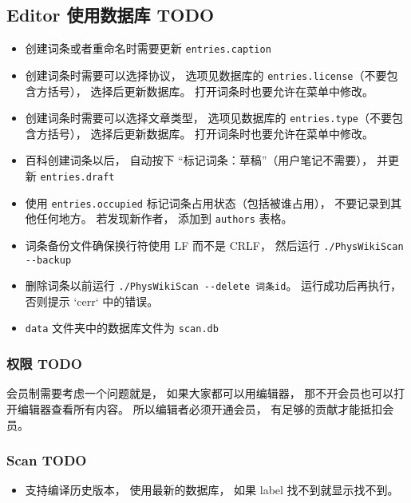 
\subsection{Editor 使用数据库 TODO}
\begin{itemize}
\item 创建词条或者重命名时需要更新 \verb|entries.caption|
\item 创建词条时需要可以选择协议， 选项见数据库的 \verb|entries.license|（不要包含方括号）， 选择后更新数据库。 打开词条时也要允许在菜单中修改。
\item 创建词条时需要可以选择文章类型， 选项见数据库的 \verb|entries.type|（不要包含方括号）， 选择后更新数据库。 打开词条时也要允许在菜单中修改。
\item 百科创建词条以后， 自动按下 “标记词条：草稿”（用户笔记不需要）， 并更新 \verb|entries.draft|
\item 使用 \verb|entries.occupied| 标记词条占用状态（包括被谁占用）， 不要记录到其他任何地方。 若发现新作者， 添加到 \verb|authors| 表格。
\item 词条备份文件确保换行符使用 LF 而不是 CRLF， 然后运行 \verb|./PhysWikiScan --backup |
\item 删除词条以前运行 \verb|./PhysWikiScan --delete 词条id|。 运行成功后再执行， 否则提示 `cerr` 中的错误。
\item \verb|data| 文件夹中的数据库文件为 \verb|scan.db|
\end{itemize}

\subsubsection{权限 TODO}
会员制需要考虑一个问题就是， 如果大家都可以用编辑器， 那不开会员也可以打开编辑器查看所有内容。 所以编辑者必须开通会员， 有足够的贡献才能抵扣会员。

\subsubsection{Scan TODO}
\begin{itemize}
\item 支持编译历史版本， 使用最新的数据库， 如果 label 找不到就显示找不到。
\end{itemize}


